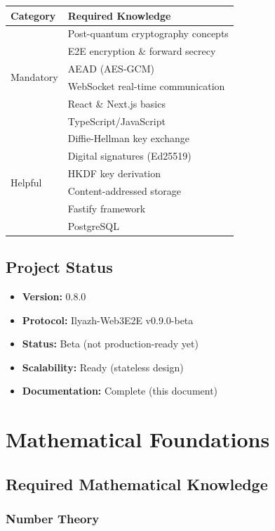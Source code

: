 \documentclass[11pt,a4paper,oneside]{book}
\begin{document}
\begin{table}[h]
\centering
\begin{tabular}{|l|l|}
\hline
\textbf{Category} & \textbf{Required Knowledge} \\
\hline
\multirow{6}{*}{Mandatory} & Post-quantum cryptography concepts \\
& E2E encryption \& forward secrecy \\
& AEAD (AES-GCM) \\
& WebSocket real-time communication \\
& React \& Next.js basics \\
& TypeScript/JavaScript \\
\hline
\multirow{6}{*}{Helpful} & Diffie-Hellman key exchange \\
& Digital signatures (Ed25519) \\
& HKDF key derivation \\
& Content-addressed storage \\
& Fastify framework \\
& PostgreSQL \\
\hline
\end{tabular}
\end{table}
\vspace{-0.3cm}\section{Project Status}
\begin{itemize}
  \item \textbf{Version:} 0.8.0
  \item \textbf{Protocol:} Ilyazh-Web3E2E v0.9.0-beta
  \item \textbf{Status:} Beta (not production-ready yet)
  \item \textbf{Scalability:} Ready (stateless design)
  \item \textbf{Documentation:} Complete (this document)
\end{itemize}
\vspace{-0.5cm}\chapter{Mathematical Foundations}
\vspace{-0.3cm}\section{Required Mathematical Knowledge}
\vspace{-0.2cm}\subsection{Number Theory}
\end{document}
